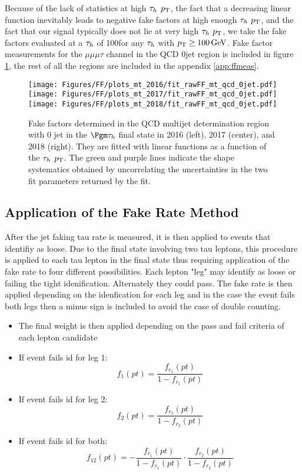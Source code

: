 Because of the lack of statistics at high $\tau_h$ $p_{\mathrm{T}}$, the fact that a decreasing linear function inevitably leads to negative fake factors at high enough $\tau_h$ $p_{\mathrm{T}}$, and the fact that our signal typically does not lie at very high $\tau_h$ $p_{\mathrm{T}}$, we take the fake factors evaluated at a $\tau_h$ \pt of 100\GeV for any $\tau_h$ with $p_{\mathrm{T}}\geq100\,\text{Ge\hspace{-.08em}V}$. Fake factor measurements for the $\mu\mu\mu\tau$ channel in the QCD 0jet region is included in figure \ref{fig:fit_raw_mt_0jet_qcd}, the rest of all the regions are included in the appendix \ref{app:ffmeas}.

\begin{figure}[ht!b]
\centering
\texttt{[image: Figures/FF/plots\_mt\_2016/fit\_rawFF\_mt\_qcd\_0jet.pdf]}
\texttt{[image: Figures/FF/plots\_mt\_2017/fit\_rawFF\_mt\_qcd\_0jet.pdf]}
\texttt{[image: Figures/FF/plots\_mt\_2018/fit\_rawFF\_mt\_qcd\_0jet.pdf]}\\
\caption{\label{fig:fit_raw_mt_0jet_qcd} Fake factors determined in the QCD multijet determination region with 0 jet in the $\Pgm\tauh$ final state in 2016 (left), 2017 (center), and 2018 (right). They are fitted with linear functions as a function of the $\tau_h$ $p_{\mathrm{T}}$. The green and purple lines indicate the shape systematics obtained by uncorrelating the uncertainties in the two fit parameters returned by the fit.  }
\end{figure}





\clearpage

\subsection{Application of the Fake Rate Method}

After the jet faking tau rate is measured, it is then applied to events that identifiy as loose. Due to the final state involving two tau leptons, this procedure is applied to each tau lepton in the final state thus requiring application of the fake rate to four different possibilities. Each lepton "leg" may identify as loose or failing the tight idenification. Alternately they could pass. The fake rate is then applied depending on the idenfication for each leg and in the case the event fails both legs then a minus sign is included to avoid the case of double counting. 
\begin{itemize}
\item{The final weight is then 
applied depending on the 
pass and fail criteria of each 
lepton candidate}
\item{If event fails id for leg 1:\[f_1(pt)=\frac{f_{r_1}(pt)}{1-f_{r_1}(pt)}\]}
\item{If event fails id for leg 2:\[f_2(pt)=\frac{f_{r_2}(pt)}{1-f_{r_2}(pt)}\]}
\item{If event fails id for both:\[f_{12}(pt)=-\frac{f_{r_1}(pt)}{1-f_{r_1}(pt)}\cdot\frac{f_{r_2}(pt)}{1-f_{r_2}(pt)}\]}
\end{itemize}


